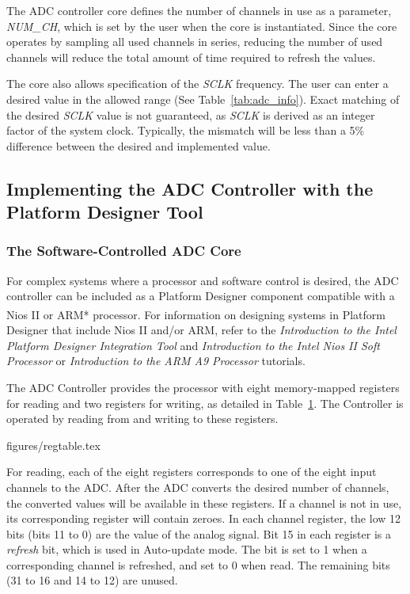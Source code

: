 \documentclass[11pt, twoside, pdftex]{article}
\begin{document}
The ADC controller core defines the number of channels in use as a parameter, {\it NUM\_CH}, which is set by the user when the core is instantiated. Since the core operates by sampling all used channels in series, reducing the number of used channels will reduce the total amount of time required to refresh the values.

The core also allows specification of the {\it SCLK} frequency. The user can enter a desired value in the allowed range (See Table~\ref{tab:adc_info}). 
Exact matching of the desired {\it SCLK} value is not guaranteed, as {\it SCLK} is derived as an integer factor of the system clock. Typically, the mismatch will be less than a 5\% difference between the desired and implemented value.

\subsection{Implementing the ADC Controller with the Platform Designer Tool}
\subsubsection{The Software-Controlled ADC Core}
For complex systems where a processor and software control is desired, the ADC controller can be included as a Platform Designer component compatible with a Nios\textsuperscript{\textregistered} II or ARM* processor. For information on designing systems in Platform Designer that include Nios II and/or ARM, refer to the {\it Introduction to the Intel Platform Designer Integration Tool} and {\it Introduction to the Intel Nios II Soft Processor} or {\it Introduction to the ARM A9 Processor} tutorials. 

The ADC Controller provides the processor with eight memory-mapped registers for reading and two registers for writing, as detailed in Table~\hyperref[tab:regfiles]{1}. The Controller is operated by reading from and writing to these registers.

 {figures/regtable.tex}

For reading, each of the eight registers corresponds to one of the eight input channels to the ADC. After the ADC converts the desired number of channels, the
converted values will be available in these registers. If a channel is not in use, its corresponding register will contain zeroes. In each channel register,
the low 12 bits (bits 11 to 0) are the value of the analog signal. Bit 15 in each register is a {\it refresh} bit, which is used in Auto-update mode. The 
bit is set to 1 when a corresponding channel is refreshed, and set to 0 when read. The remaining bits (31 to 16 and 14 to 12) are unused.
\end{document}

